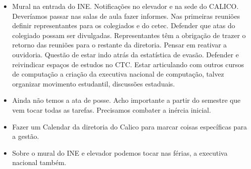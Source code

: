 \documentclass{ata-calico}
\begin{document}
\begin{itemize}
\item Mural na entrada do INE. Notificações no elevador e na sede do CALICO.
  Deveríamos passar nas salas de aula fazer informes.  Nas primeiras reuniões
  definir representantes para os colegiados e do cetec. Defender que atas do
  colegiado possam ser divulgadas.  Representantes têm a obrigação de trazer o
  retorno das reuniões para o restante da diretoria.  Pensar em reativar a
  ouvidoria. Questão de estar indo atrás da estatística de evasão. Defender e
  reivindicar espaços de estudos no CTC.  Estar articulando com outros cursos de
  computação a criação da executiva nacional de computação, talvez organizar
  movimento estudantil, discussões estaduais.
\item Ainda não temos a ata de posse. Acho importante a partir do semestre que vem
  tocar todas as tarefas. Precisamos combater a inércia inicial.
\item Fazer um Calendar da diretoria do Calico para marcar coisas específicas para
  a gestão.
\item Sobre o mural do INE e elevador podemos tocar nas férias, a executiva
  nacional também.
\end{itemize}

\end{document}
